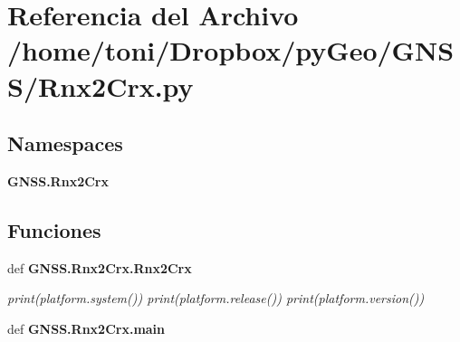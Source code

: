 \section{Referencia del Archivo /home/toni/\-Dropbox/py\-Geo/\-G\-N\-S\-S/\-Rnx2\-Crx.py}
\label{Rnx2Crx_8py}
\subsection*{Namespaces}
\begin{DoxyCompactItemize}
\item 
{\bf G\-N\-S\-S.\-Rnx2\-Crx}
\end{DoxyCompactItemize}
\subsection*{Funciones}
\begin{DoxyCompactItemize}
\item 
def {\bf G\-N\-S\-S.\-Rnx2\-Crx.\-Rnx2\-Crx}
\begin{DoxyCompactList}\small\item\em print(platform.\-system()) print(platform.\-release()) print(platform.\-version()) \end{DoxyCompactList}\item 
def {\bf G\-N\-S\-S.\-Rnx2\-Crx.\-main}
\end{DoxyCompactItemize}
